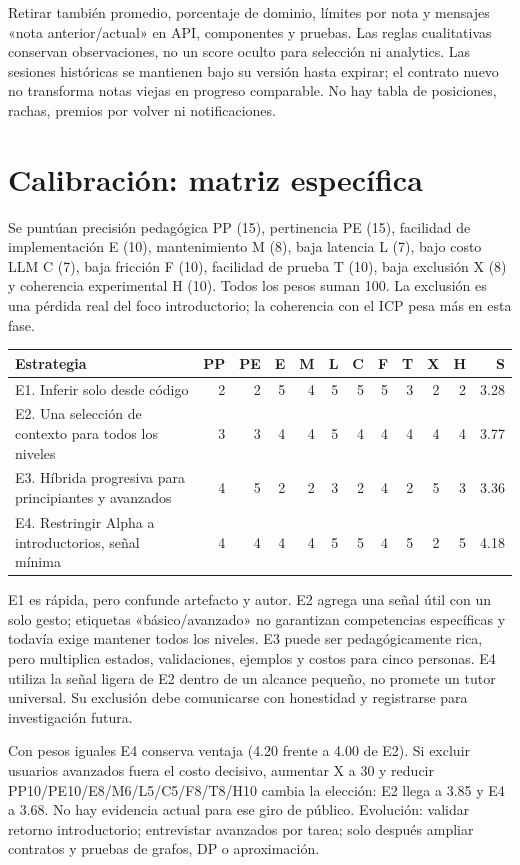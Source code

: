 \documentclass[11pt,a4paper]{report}
\begin{document}
Retirar también promedio, porcentaje de dominio, límites por nota y mensajes «nota anterior/actual» en API, componentes y pruebas. Las reglas cualitativas conservan observaciones, no un score oculto para selección ni analytics. Las sesiones históricas se mantienen bajo su versión hasta expirar; el contrato nuevo no transforma notas viejas en progreso comparable. No hay tabla de posiciones, rachas, premios por volver ni notificaciones.

\section{Calibración: matriz específica}
Se puntúan precisión pedagógica PP (15), pertinencia PE (15), facilidad de implementación E (10), mantenimiento M (8), baja latencia L (7), bajo costo LLM C (7), baja fricción F (10), facilidad de prueba T (10), baja exclusión X (8) y coherencia experimental H (10). Todos los pesos suman 100. La exclusión es una pérdida real del foco introductorio; la coherencia con el ICP pesa más en esta fase.

\begin{landscape}
\small
\begin{longtable}{P{7.5cm}rrrrrrrrrrr}
\toprule Estrategia & PP&PE&E&M&L&C&F&T&X&H&S\\\midrule\endhead
E1. Inferir solo desde código &2&2&5&4&5&5&5&3&2&2&3.28\\
E2. Una selección de contexto para todos los niveles &3&3&4&4&5&4&4&4&4&4&3.77\\
E3. Híbrida progresiva para principiantes y avanzados &4&5&2&2&3&2&4&2&5&3&3.36\\
E4. Restringir Alpha a introductorios, señal mínima &4&4&4&4&5&5&4&5&2&5&4.18\\\bottomrule
\end{longtable}
\end{landscape}

E1 es rápida, pero confunde artefacto y autor. E2 agrega una señal útil con un solo gesto; etiquetas «básico/avanzado» no garantizan competencias específicas y todavía exige mantener todos los niveles. E3 puede ser pedagógicamente rica, pero multiplica estados, validaciones, ejemplos y costos para cinco personas. E4 utiliza la señal ligera de E2 dentro de un alcance pequeño, no promete un tutor universal. Su exclusión debe comunicarse con honestidad y registrarse para investigación futura.

Con pesos iguales E4 conserva ventaja (4.20 frente a 4.00 de E2). Si excluir usuarios avanzados fuera el costo decisivo, aumentar X a 30 y reducir PP10/PE10/E8/M6/L5/C5/F8/T8/H10 cambia la elección: E2 llega a 3.85 y E4 a 3.68. No hay evidencia actual para ese giro de público. Evolución: validar retorno introductorio; entrevistar avanzados por tarea; solo después ampliar contratos y pruebas de grafos, DP o aproximación.
\end{document}
